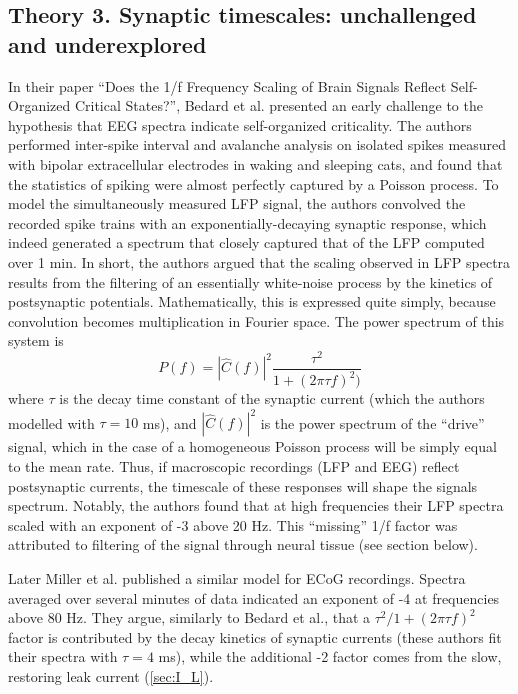 \subsection{Theory 3. Synaptic timescales: unchallenged and underexplored} \label{sec:timescales}
In their paper ``Does the 1/f Frequency Scaling of Brain Signals Reflect Self-Organized Critical States?'', Bedard et al.\cite{Bedard2006} presented an early challenge to the hypothesis that EEG spectra indicate self-organized criticality. The authors performed inter-spike interval and avalanche analysis on isolated spikes measured with bipolar extracellular electrodes in waking and sleeping cats, and found that the statistics of spiking were almost perfectly captured by a Poisson process. To model the simultaneously measured LFP signal, the authors convolved the recorded spike trains with an exponentially-decaying synaptic response, which indeed generated a spectrum that closely captured that of the LFP computed over 1 min. In short, the authors argued that the scaling observed in LFP spectra results from the filtering of an essentially white-noise process by the kinetics of postsynaptic potentials. Mathematically, this is expressed quite simply, because convolution becomes multiplication in Fourier space. The power spectrum of this system is
\begin{equation}
P(f) =|\hat{C}(f)|^2 \frac{\tau^2} { 1+ (2\pi\tau f)^2)}
\end{equation}
where $\tau$ is the decay time constant of the synaptic current (which the authors modelled with $\tau=10$ \unit{\milli\second}), and $|\hat{C}(f)|^2$ is the power spectrum of the ``drive'' signal, which in the case of a homogeneous Poisson process will be simply equal to the mean rate. Thus, if macroscopic recordings (LFP and EEG) reflect postsynaptic currents, the timescale of these responses will shape the signals spectrum. Notably, the authors found that at high frequencies their LFP spectra scaled with an exponent of -3 above 20 Hz. This ``missing'' 1/f factor was attributed to filtering of the signal through neural tissue (see section below).

Later Miller et al. \cite{Miller2009} published a similar model for ECoG recordings. Spectra averaged over several minutes of data indicated an exponent of -4 at frequencies above 80 Hz. They argue, similarly to Bedard et al., that a $\tau^2 / 1+ (2\pi\tau f)^2 $ factor is contributed by the decay kinetics of synaptic currents (these authors fit their spectra with $\tau=4$ \unit{\milli\second}), while the additional -2 factor comes from the slow, restoring leak current (\autoref{sec:I_L}).


